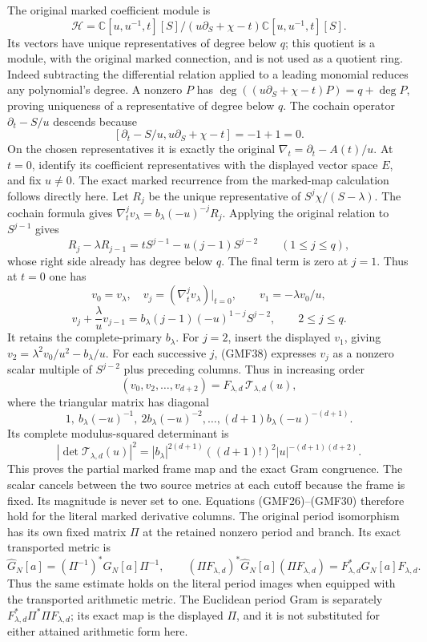 \documentclass[11pt]{article}
\newcommand{\C}{\mathbb C}
\begin{document}
The original marked coefficient module is
\[
 \mathscr H=\C[u,u^{-1},t][S]\big/
       (u\partial_S+\chi-t)\C[u,u^{-1},t][S].
\]
Its vectors have unique representatives of degree below
\(q\); this quotient is a module, with the original marked
connection, and is not used as a quotient ring.
Indeed subtracting the differential relation applied to
a leading monomial reduces any polynomial's degree.
A nonzero \(P\) has
\(\deg((u\partial_S+\chi-t)P)=q+\deg P\), proving
uniqueness of a representative of degree below \(q\).
The cochain operator \(\partial_t-S/u\) descends because
\[
 [\partial_t-S/u,u\partial_S+\chi-t]=-1+1=0.
\]
On the chosen representatives it is exactly the original
\(\nabla_t=\partial_t-A(t)/u\).
At \(t=0\), identify its coefficient representatives with
the displayed vector space \(E\), and fix \(u\ne0\).
The exact marked recurrence from the marked-map
calculation \cite{markedProvider} follows directly here.
Let \(R_j\) be the unique representative of
\(S^j\chi/(S-\lambda)\).  The cochain formula gives
\(\nabla_t^jv_\lambda=b_\lambda(-u)^{-j}R_j\).
Applying the original relation to \(S^{j-1}\) gives
\[
 R_j-\lambda R_{j-1}
   =tS^{j-1}-u(j-1)S^{j-2}\qquad(1\le j\le q),
\]
whose right side already has degree below \(q\).
The final term is zero at \(j=1\).
Thus at \(t=0\) one has
\[
 v_0=v_\lambda,\quad v_j=(\nabla_t^j v_\lambda)|_{t=0},
 \qquad v_1=-\lambda v_0/u,
\]
\begin{equation}\tag{GMF38}
 v_j+\frac{\lambda}{u}v_{j-1}
   =b_\lambda(j-1)(-u)^{1-j}S^{j-2},
                    \qquad 2\le j\le q.
\end{equation}
It retains the complete-primary \(b_\lambda\).
For \(j=2\), insert the displayed \(v_1\), giving
\(v_2=\lambda^2v_0/u^2-b_\lambda/u\).
For each successive \(j\), (GMF38) expresses \(v_j\)
as a nonzero scalar multiple of \(S^{j-2}\) plus preceding
columns.  Thus in increasing order
\[
 (v_0,v_2,\ldots,v_{d+2})
       =F_{\lambda,d}\,\mathcal T_{\lambda,d}(u),
\]
where the triangular matrix has diagonal
\[
 1,\ b_\lambda(-u)^{-1},\
 2b_\lambda(-u)^{-2},\ldots,
 (d+1)b_\lambda(-u)^{-(d+1)}.
\]
Its complete modulus-squared determinant is
\begin{equation}\tag{GMF39}
 |\det\mathcal T_{\lambda,d}(u)|^2
 =|b_\lambda|^{2(d+1)}((d+1)!)^2
                        |u|^{-(d+1)(d+2)}.
\end{equation}
This proves the partial marked frame map and the exact
Gram congruence.  The scalar cancels between the two source
metrics at each cutoff because the frame is fixed.
Its magnitude is never set to one.  Equations (GMF26)--(GMF30)
therefore hold for the literal marked derivative columns.
The original period isomorphism has its own fixed matrix
\(\Pi\) at the retained nonzero period and branch.  Its exact
transported metric is
\[
 \widehat G_N[a]=(\Pi^{-1})^*G_N[a]\Pi^{-1},\qquad
 (\Pi F_{\lambda,d})^*\widehat G_N[a](\Pi F_{\lambda,d})
                  =F_{\lambda,d}^*G_N[a]F_{\lambda,d}.
\]
Thus the same estimate holds on the literal period images
when equipped with the transported arithmetic metric.
The Euclidean period Gram is separately
\(F_{\lambda,d}^*\Pi^*\Pi F_{\lambda,d}\);
its exact map is the displayed \(\Pi\), and it is not
substituted for either attained arithmetic form here.
\end{document}

